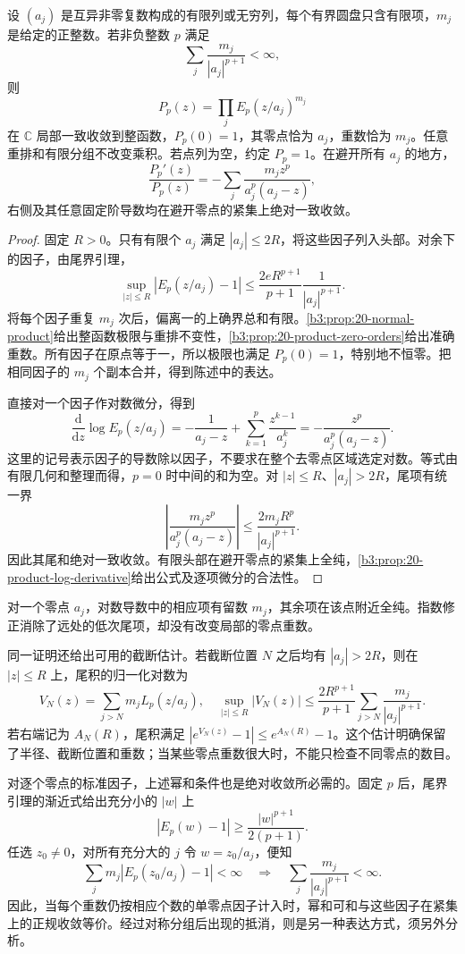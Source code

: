 \begin{proposition}[固定阶数的典范乘积]\label{b3:prop:20-fixed-genus-product}
设 \((a_j)\) 是互异非零复数构成的有限列或无穷列，每个有界圆盘只含有限项，\(m_j\) 是给定的正整数。若非负整数 \(p\) 满足
\[
 \sum_j\frac{m_j}{|a_j|^{p+1}}<\infty,
\]
则
\[
 P_p(z)=\prod_j E_p(z/a_j)^{m_j}
\]
在 \(\mathbb C\) 局部一致收敛到整函数，\(P_p(0)=1\)，其零点恰为 \(a_j\)，重数恰为 \(m_j\)。任意重排和有限分组不改变乘积。若点列为空，约定 \(P_p=1\)。在避开所有 \(a_j\) 的地方，
\[
 \frac{P_p'(z)}{P_p(z)}
 =-\sum_j\frac{m_j z^p}{a_j^p(a_j-z)},
\]
右侧及其任意固定阶导数均在避开零点的紧集上绝对一致收敛。
\end{proposition}
\begin{proof}
固定 \(R>0\)。只有有限个 \(a_j\) 满足 \(|a_j|\le2R\)，将这些因子列入头部。对余下的因子，由尾界引理，
\[
 \sup_{|z|\le R}|E_p(z/a_j)-1|
 \le\frac{2eR^{p+1}}{p+1}\frac1{|a_j|^{p+1}}.
\]
将每个因子重复 \(m_j\) 次后，偏离一的上确界总和有限。\cref{b3:prop:20-normal-product}给出整函数极限与重排不变性，\cref{b3:prop:20-product-zero-orders}给出准确重数。所有因子在原点等于一，所以极限也满足 \(P_p(0)=1\)，特别地不恒零。把相同因子的 \(m_j\) 个副本合并，得到陈述中的表达。

直接对一个因子作对数微分，得到
\[
 \frac{\mathrm{d}}{\mathrm{d}z}\log E_p(z/a_j)
 =-\frac1{a_j-z}+\sum_{k=1}^p\frac{z^{k-1}}{a_j^k}
 =-\frac{z^p}{a_j^p(a_j-z)}.
\]
这里的记号表示因子的导数除以因子，不要求在整个去零点区域选定对数。等式由有限几何和整理而得，\(p=0\) 时中间的和为空。对 \(|z|\le R\)、\(|a_j|>2R\)，尾项有统一界
\[
 \left|\frac{m_j z^p}{a_j^p(a_j-z)}\right|
 \le\frac{2m_jR^p}{|a_j|^{p+1}}.
\]
因此其尾和绝对一致收敛。有限头部在避开零点的紧集上全纯，\cref{b3:prop:20-product-log-derivative}给出公式及逐项微分的合法性。
\end{proof}
对一个零点 \(a_j\)，对数导数中的相应项有留数 \(m_j\)，其余项在该点附近全纯。指数修正消除了远处的低次尾项，却没有改变局部的零点重数。

\ProseParagraphBreak

同一证明还给出可用的截断估计。若截断位置 \(N\) 之后均有 \(|a_j|>2R\)，则在 \(|z|\le R\) 上，尾积的归一化对数为
\[
 V_N(z)=\sum_{j>N}m_jL_p(z/a_j),\quad
 \sup_{|z|\le R}|V_N(z)|
 \le\frac{2R^{p+1}}{p+1}
       \sum_{j>N}\frac{m_j}{|a_j|^{p+1}}.
\]
若右端记为 \(A_N(R)\)，尾积满足 \(|e^{V_N(z)}-1|\le e^{A_N(R)}-1\)。这个估计明确保留了半径、截断位置和重数；当某些零点重数很大时，不能只检查不同零点的数目。

\ProseParagraphBreak

对逐个零点的标准因子，上述幂和条件也是绝对收敛所必需的。固定 \(p\) 后，尾界引理的渐近式给出充分小的 \(|w|\) 上
\[
 |E_p(w)-1|\ge\frac{|w|^{p+1}}{2(p+1)}.
\]
任选 \(z_0\ne0\)，对所有充分大的 \(j\) 令 \(w=z_0/a_j\)，便知
\[
 \sum_jm_j|E_p(z_0/a_j)-1|<\infty
 \quad\Longrightarrow\quad
 \sum_j\frac{m_j}{|a_j|^{p+1}}<\infty.
\]
因此，当每个重数仍按相应个数的单零点因子计入时，幂和可和与这些因子在紧集上的正规收敛等价。经过对称分组后出现的抵消，则是另一种表达方式，须另外分析。

